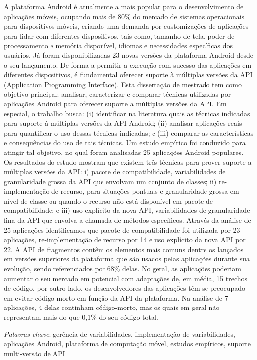 \noindent A plataforma Android é atualmente a mais popular para o desenvolvimento
de aplicações móveis, ocupando mais de 80\% do mercado de sistemas operacionais para
dispositivos móveis, criando uma demanda por customizações de aplicações para lidar
com diferentes dispositivos, tais como, tamanho de tela, poder de processamento e
memória disponível, idiomas e necessidades específicas dos usuários. Já foram
disponibilizadas 23 novas versões da plataforma Android desde o seu lançamento. De
forma a permitir a execução com sucesso das aplicações em diferentes dispositivos,
é fundamental oferecer suporte à múltiplas versões da API (Application Programming
Interface). Esta dissertação de mestrado tem como objetivo principal: analisar,
caracterizar e comparar técnicas utilizadas por aplicações Android para oferecer
suporte a múltiplas versões da API. Em especial, o trabalho busca: (i) identificar
na literatura quais as técnicas indicadas para suporte à múltiplas versões da API
Android; (ii) analisar aplicações reais para quantificar o uso dessas técnicas
indicadas; e (iii) comparar as características e consequências do uso de tais
técnicas. Um estudo empírico foi conduzido para atingir tal objetivo, no qual
foram analisadas 25 aplicações Android populares. Os resultados do estudo mostram
que existem três técnicas para prover suporte a múltiplas versões da API: i) pacote
de compatibilidade, variabilidades de granularidade grossa da API que envolvam um
conjunto de classes; ii) re-implementação de recurso, para situações pontuais e
granularidade grossa em nível de classe ou quando o recurso não está disponível
em pacote de compatibilidade; e iii) uso explícito da nova API, variabilidades de
granularidade fina da API que envolva a chamada de métodos específicos. Através da
análise de 25 aplicações identificamos que pacote de compatibilidade foi utilizada
por 23 aplicações, re-implementação de recurso por 14 e uso explícito da nova API
por 22. A API de fragmentos contêm os elementos mais comuns dentre os lançados em
versões superiores da plataforma que são usados pelas aplicações durante sua evolução,
sendo referenciados por 68\% delas. No geral, as aplicações poderiam aumentar o seu
mercado em potencial com adaptações de, em média, 15 trechos de código, por outro
lado, os desenvolvedores das aplicações têm se preocupado em evitar código-morto em
função da API da plataforma. Na análise de 7 aplicações, 4 delas continham código-morto,
mas os quais em geral não representam mais do que 0,1\% do seu código total.

\noindent\textit{Palavras-chave}: gerência de variabilidades, implementação de variabilidades, 
aplicações Android, plataforma de computação móvel, estudos empíricos, suporte
multi-versão de API